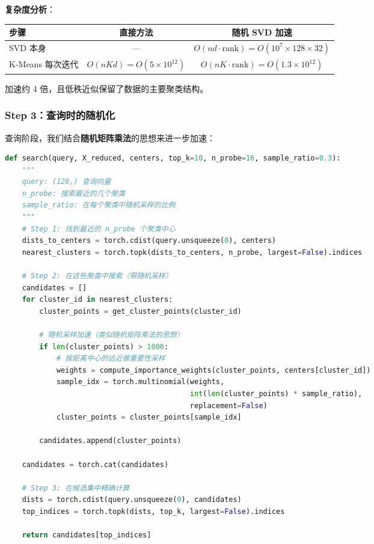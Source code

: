\documentclass[11pt,a4paper]{ctexart}
\theoremstyle{definition}
\theoremstyle{remark}
\begin{document}
\textbf{复杂度分析}：
\begin{center}
\begin{tabular}{lcc}
\toprule
步骤 & 直接方法 & 随机 SVD 加速 \\
\midrule
SVD 本身 & — & $O(nd \cdot \text{rank}) = O(10^7 \times 128 \times 32)$ \\
K-Means 每次迭代 & $O(nKd) = O(5 \times 10^{12})$ & $O(nK \cdot \text{rank}) = O(1.3 \times 10^{12})$ \\
\bottomrule
\end{tabular}
\end{center}

加速约 4 倍，且低秩近似保留了数据的主要聚类结构。

\subsubsection{Step 3：查询时的随机化}

查询阶段，我们结合\textbf{随机矩阵乘法}的思想来进一步加速：

\begin{lstlisting}[language=Python]
def search(query, X_reduced, centers, top_k=10, n_probe=16, sample_ratio=0.3):
    """
    query: (128,) 查询向量
    n_probe: 搜索最近的几个聚类
    sample_ratio: 在每个聚类中随机采样的比例
    """
    # Step 1: 找到最近的 n_probe 个聚类中心
    dists_to_centers = torch.cdist(query.unsqueeze(0), centers)
    nearest_clusters = torch.topk(dists_to_centers, n_probe, largest=False).indices
    
    # Step 2: 在这些聚类中搜索（带随机采样）
    candidates = []
    for cluster_id in nearest_clusters:
        cluster_points = get_cluster_points(cluster_id)
        
        # 随机采样加速（类似随机矩阵乘法的思想）
        if len(cluster_points) > 1000:
            # 按距离中心的远近做重要性采样
            weights = compute_importance_weights(cluster_points, centers[cluster_id])
            sample_idx = torch.multinomial(weights, 
                                           int(len(cluster_points) * sample_ratio),
                                           replacement=False)
            cluster_points = cluster_points[sample_idx]
        
        candidates.append(cluster_points)
    
    candidates = torch.cat(candidates)
    
    # Step 3: 在候选集中精确计算
    dists = torch.cdist(query.unsqueeze(0), candidates)
    top_indices = torch.topk(dists, top_k, largest=False).indices
    
    return candidates[top_indices]
\end{lstlisting}
\end{document}
